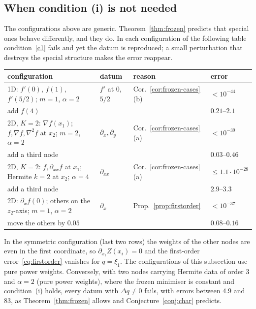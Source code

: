 \documentclass[12pt]{amsart}
\theoremstyle{definition}
\theoremstyle{remark}
\begin{document}
\subsection{When condition (i) is not needed}\label{sec:frozen-num}
The configurations above are generic. Theorem~\ref{thm:frozen} predicts that special ones
behave differently, and they do. In each configuration of the following table condition~\ref{c1}
fails and yet the datum is reproduced; a small perturbation that destroys the special structure
makes the error reappear.

\smallskip
\begin{center}\footnotesize
\begin{tabular}{@{}llll@{}}
\toprule
configuration & datum & reason & error\\
\midrule
1D: $f'(0)$, $f(1)$, $f'(5/2)$; $m=1$, $\alpha=2$ & $f'$ at $0$, $5/2$ & Cor.~\ref{cor:frozen-cases}(b) & $<10^{-44}$\\
\quad add $f(4)$ & & & $0.21$--$2.1$\\
2D, $K=2$: $\nabla f(x_1)$; $f,\nabla f,\nabla^2f$ at $x_2$; $m=2$, $\alpha=2$ & $\partial_x,\partial_y$ & Cor.~\ref{cor:frozen-cases}(a) & $<10^{-39}$\\
\quad add a third node & & & $0.03$--$0.46$\\
2D, $K=2$: $f,\partial_{xx}f$ at $x_1$; Hermite $k=2$ at $x_2$; $\alpha=4$ & $\partial_{xx}$ & Cor.~\ref{cor:frozen-cases}(a) & $\le1.1\cdot10^{-28}$\\
\quad add a third node & & & $2.9$--$3.3$\\
2D: $\partial_xf(0)$; others on the $z_2$-axis; $m=1$, $\alpha=2$ & $\partial_x$ & Prop.~\ref{prop:firstorder} & $<10^{-37}$\\
\quad move the others by $0.05$ & & & $0.08$--$0.16$\\
\bottomrule
\end{tabular}
\end{center}
\smallskip

\noindent In the symmetric configuration (last two rows) the weights of the other nodes are even
in the first coordinate, so $\partial_{x_1}Z(x_i)=0$ and the first-order error~\eqref{eq:firstorder} vanishes
for $q=\xi_1$. The configurations of this subsection use pure power weights. Conversely, with
two nodes carrying Hermite data of order $3$ and $\alpha=2$ (pure power weights), where the
frozen minimiser is constant and condition~(i) holds, every datum with $\Delta q\ne0$ fails,
with errors between $4.9$ and $83$, as Theorem~\ref{thm:frozen} allows and
Conjecture~\ref{conj:char} predicts.
\end{document}
